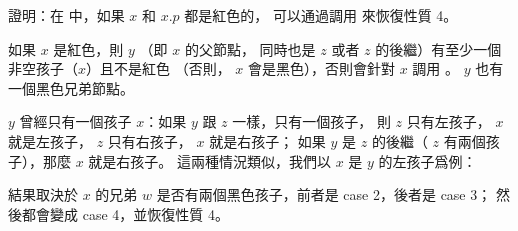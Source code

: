 \startEXERCISE
證明：在  中，如果 $x$ 和 $x.p$ 都是紅色的，
可以通過調用  來恢復性質 4。
\stopEXERCISE

\startANSWER
如果 $x$ 是紅色，則 $y$ （即 $x$ 的父節點，
同時也是 $z$ 或者 $z$ 的後繼）有至少一個非空孩子（$x$）且不是紅色
（否則， $x$ 會是黑色），否則會針對 $x$ 調用 。
 $y$ 也有一個黑色兄弟節點。

$y$ 曾經只有一個孩子 $x$：如果 $y$ 跟 $z$ 一樣，只有一個孩子，
則 $z$ 只有左孩子， $x$ 就是左孩子， $z$ 只有右孩子， $x$ 就是右孩子；
如果 $y$ 是 $z$ 的後繼（ $z$ 有兩個孩子），那麼 $x$ 就是右孩子。
這兩種情況類似，我們以 $x$ 是 $y$ 的左孩子爲例：

結果取決於 $x$ 的兄弟 $w$ 是否有兩個黑色孩子，前者是 case 2，後者是 case 3；
然後都會變成 case 4，並恢復性質 4。
\stopANSWER

